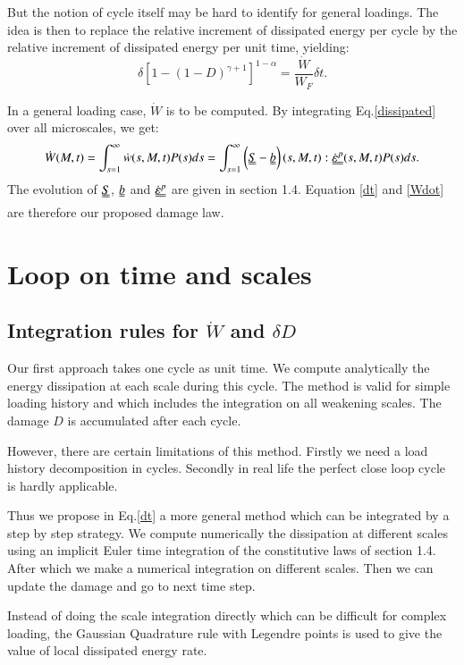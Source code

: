 \documentclass[3p,times,number,review]{elsarticle}
\begin{document}
But the notion of cycle itself may be hard to identify for general loadings. The idea is then to replace the relative increment of dissipated energy per cycle by the relative increment of dissipated energy per unit time, yielding:
\begin{equation}
\delta [1-(1-D)^{\gamma+1}]^{1-\alpha}=\dfrac{\dot{W}}{W_F}\delta t.
\label{dt}
\end{equation}

In a general loading case, $\dot{W}$ is to be computed. By integrating Eq.\eqref{dissipated} over all microscales, we get:
\begin{equation}\dot{W}(M,t)=\int_{s=1}^{\infty}\dot{w}(s,M,t)P(s)ds=\int_{s=1}^{\infty}\left(\uuline{S}-\uuline{b} \right) (s,M,t):\uuline{\dot{\varepsilon}^p}(s,M,t)P(s)ds.\label{Wdot}
\end{equation}
The evolution of $\uuline{S}$, $\uuline{b}$ and $\uuline{\dot{\varepsilon}^p}$ are given in section 1.4. Equation \eqref{dt} and \eqref{Wdot} are therefore our proposed damage law.

\section{Loop on time and scales}
\subsection{Integration rules for $\dot{W}$ and $\delta D$}
Our first approach takes one cycle as unit time. We compute analytically the energy dissipation at each scale during this cycle. The method is valid for simple loading history and which includes the integration on all weakening scales. The damage $D$ is accumulated after each cycle.

However, there are certain limitations of this method. Firstly we need a load history decomposition in cycles. Secondly in real life the perfect close loop cycle is hardly applicable.

Thus we propose in Eq.\eqref{dt} a more general method which can be integrated by a step by step strategy. We compute numerically the dissipation at different scales using an implicit Euler time integration of the constitutive laws of section 1.4. After which we make a numerical integration on different scales. Then we can update the damage and go to next time step. 

Instead of doing the scale integration directly which can be difficult for complex loading, the Gaussian Quadrature rule with Legendre points is used to give the value of local dissipated energy rate.
\end{document}
